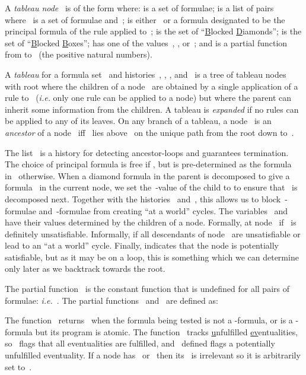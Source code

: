 \documentclass{entcs}
\newcommand{\ie}{\emph{i.e.}}
\newcommand{\fea}{}
\begin{document}
\begin{definition}
  A \emph{tableau node}~ is of the form  where:
   is a set of formulae;
   is a list of pairs~ where~ is a set of formulae and~;
   is either~ or a formula designated to be the principal formula of the rule applied to~;
   is the set of ``\underline{B}locked \underline{D}iamonds'';
   is the set of ``\underline{B}locked \underline{B}oxes'';
   has one of the values~, , or~; and
   is a partial function from 
  to~ (the positive natural numbers).
\end{definition}

\begin{definition}
  A \emph{tableau} for a formula set~ and histories~, , , and~
  is a tree of tableau nodes with root 
  where the children of a node~ are obtained by a single application of a rule to~
  (\ie{} only one rule can be applied to a node)
  but where the parent can inherit some information from the children.
  A tableau is \emph{expanded} if no rules can be applied to any of its leaves.
  On any branch of a tableau, a node~ is an \emph{ancestor} of a node~
  iff~ lies above~ on the unique path from the root down to~.
\end{definition}

The list~ is a history for detecting ancestor-loops and guarantees termination. 
The choice of principal formula is free if , but is pre-determined as the
formula in~ otherwise.
When a diamond formula in the parent is decomposed
to give a formula~ in the current node,
we set the~-value of the child to  to  ensure that~ is decomposed next.
Together with the histories~ and~,
this allows us to block~-formulae and~-formulae
from creating ``at a world'' cycles.
The variables~ and~ have their values
determined by the children of a node.
Formally,  at node~
if~ is definitely unsatisfiable.
Informally,  if all descendants of node~ are unsatisfiable
or lead to an ``at a world'' cycle.
Finally,  indicates that the node is potentially satisfiable,
but as it may be on a loop,
this is something which we can determine only later as we backtrack towards the root. 

\begin{definition}
  The partial function~ is the constant function
  that is undefined for all pairs of formulae: \ie{}~.
  The partial functions~ and~ are defined as:
  
\end{definition}
The function~ returns~
when the formula being tested is not a \fea{}-formula,
or is a \fea{}-formula but its program is atomic.
The function~ tracks
\underline{u}nfulfilled \underline{ev}entualities,
so~ flags that all eventualities are fulfilled,
and~ defined flags a potentially unfulfilled eventuality.
If a node has~ or~
then its~ is irrelevant so it is arbitrarily set to~.
\end{document}

